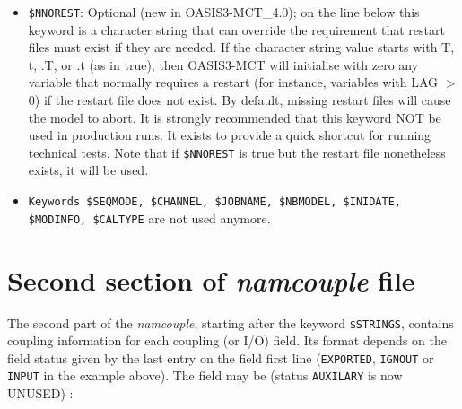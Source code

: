 \begin{itemize}
\item {\tt \$NNOREST}: Optional (new in OASIS3-MCT\_4.0); on the line below this keyword is a character
  string that can override the requirement that restart files must exist
  if they are needed.  If the character string value starts with T, t, .T,
  or .t (as in true), then OASIS3-MCT will initialise with zero any variable that normally requires
  a restart (for instance, variables with LAG $>$ 0) if the restart file does not exist. By default, missing
  restart files will cause the model to abort.  It is strongly recommended
  that this keyword NOT be used in production runs.  It exists to provide a
  quick shortcut for running technical tests.
  Note that if {\tt \$NNOREST} is true but the restart file nonetheless exists, it will be used.

\item {\tt Keywords \$SEQMODE, \$CHANNEL, \$JOBNAME, \$NBMODEL, \$INIDATE, \$MODINFO, \$CALTYPE} are not used anymore.

\end{itemize}


\section{Second section of {\it namcouple} file }
\label{subsec_namcouplesecond}

The second part of the {\it namcouple}, starting after the keyword
{\tt \$STRINGS}, contains coupling information for each coupling (or
I/O) field.  Its format depends on the field status given by the last
entry on the field first line ({\tt EXPORTED}, {\tt IGNOUT} or {\tt
  INPUT} in the example above). The field may be (status {\tt AUXILARY} is now UNUSED) :

